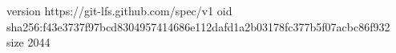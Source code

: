 version https://git-lfs.github.com/spec/v1
oid sha256:f43e3737f97bcd8304957414686e112dafd1a2b03178fc377b5f07acbc86f932
size 2044
